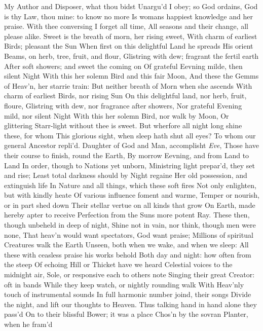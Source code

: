 \documentclass[11pt]{book}
\newcounter {first}
\begin{document}
My Author and Disposer, what thou bidst 
Unargu'd I obey; so God ordains, 
God is thy Law, thou mine: to know no more 
Is womans happiest knowledge and her praise. 
With thee conversing I forget all time, 
All seasons and their change, all please alike. 
Sweet is the breath of morn, her rising sweet, 
With charm of earliest Birds; pleasant the Sun 
When first on this delightful Land he spreads 
His orient Beams, on herb, tree, fruit, and flour, 
Glistring with dew; fragrant the fertil earth 
After soft showers; and sweet the coming on 
Of grateful Eevning milde, then silent Night 
With this her solemn Bird and this fair Moon, 
And these the Gemms of Heav'n, her starrie train: 
But neither breath of Morn when she ascends 
With charm of earliest Birds, nor rising Sun 
On this delightful land, nor herb, fruit, floure, 
Glistring with dew, nor fragrance after showers, 
Nor grateful Evening mild, nor silent Night 
With this her solemn Bird, nor walk by Moon, 
Or glittering Starr-light without thee is sweet. 
But wherfore all night long shine these, for whom 
This glorious sight, when sleep hath shut all eyes? 
\quad To whom our general Ancestor repli'd. 
Daughter of God and Man, accomplisht \textit{Eve}, 
Those have their course to finish, round the Earth, 
By morrow Eevning, and from Land to Land 
In order, though to Nations yet unborn, 
Ministring light prepar'd, they set and rise; 
Least total darkness should by Night regaine 
Her old possession, and extinguish life 
In Nature and all things, which these soft fires 
Not only enlighten, but with kindly heate 
Of various influence foment and warme, 
Temper or nourish, or in part shed down 
Their stellar vertue on all kinds that grow 
On Earth, made hereby apter to receive 
Perfection from the Suns more potent Ray. 
These then, though unbeheld in deep of night, 
Shine not in vain, nor think, though men were none, 
That heav'n would want spectators, God want praise; 
Millions of spiritual Creatures walk the Earth 
Unseen, both when we wake, and when we sleep: 
All these with ceasless praise his works behold 
Both day and night: how often from the steep 
Of echoing Hill or Thicket have we heard 
Celestial voices to the midnight air, 
Sole, or responsive each to others note 
Singing their great Creator: oft in bands 
While they keep watch, or nightly rounding walk 
With Heav'nly touch of instrumental sounds 
In full harmonic number joind, their songs 
Divide the night, and lift our thoughts to Heaven. 
\quad Thus talking hand in hand alone they pass'd 
On to their blissful Bower; it was a place 
Chos'n by the sovran Planter, when he fram'd 
\end{document}

